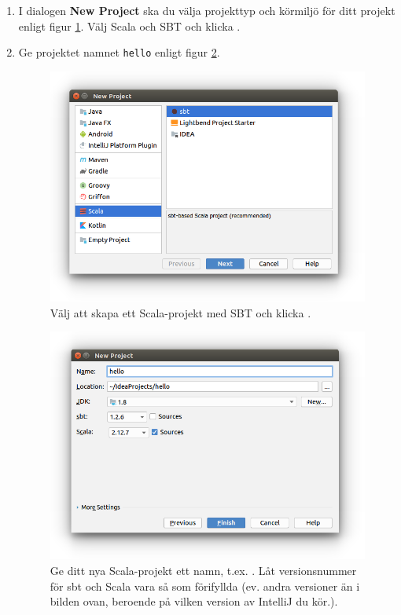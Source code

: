 \begin{enumerate}
\item I dialogen \textbf{New Project} ska du välja projekttyp och körmiljö för ditt projekt enligt figur \ref{fig:idea:new-project}. Välj Scala och SBT och klicka .

\item Ge projektet namnet \texttt{hello} enligt figur \ref{fig:idea:new-hello-project}.

\begin{figure}[H]
\centering
\includegraphics[width=1.0\textwidth]{../img/intellij/idea-new-scala-project.png}
\caption{Välj att skapa ett Scala-projekt med SBT och klicka .}
\label{fig:idea:new-project}
\end{figure}

\begin{figure}[h]
\centering
\includegraphics[width=1.0\textwidth]{../img/intellij/idea-new-hello-project.png}
\caption{Ge ditt nya Scala-projekt ett namn, t.ex. . Låt versionsnummer för sbt och Scala vara så som förifyllda (ev. andra versioner än i bilden ovan, beroende på vilken version av IntelliJ du kör.). \label{fig:idea:new-hello-project}}


\end{figure}
\end{enumerate}
